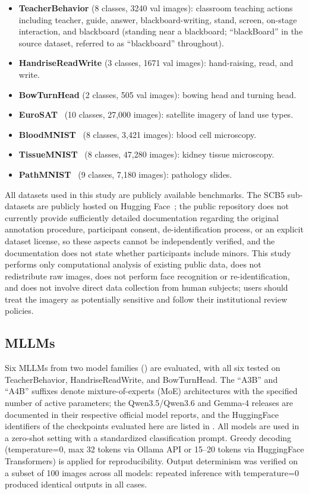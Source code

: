 \documentclass[11pt,a4paper]{article}
\begin{document}
\begin{itemize}
    \item \textbf{TeacherBehavior} (8 classes, 3240 val images): classroom teaching actions including teacher, guide, answer, blackboard-writing, stand, screen, on-stage interaction, and blackboard (standing near a blackboard; ``blackBoard'' in the source dataset, referred to as ``blackboard'' throughout).
    \item \textbf{HandriseReadWrite} (3 classes, 1671 val images): hand-raising, read, and write.
    \item \textbf{BowTurnHead} (2 classes, 505 val images): bowing head and turning head.
    \item \textbf{EuroSAT}~\cite{helber2019eurosat} (10 classes, 27{,}000 images): satellite imagery of land use types.
    \item \textbf{BloodMNIST}~\cite{yang2023medmnist} (8 classes, 3{,}421 images): blood cell microscopy.
    \item \textbf{TissueMNIST}~\cite{yang2023medmnist} (8 classes, 47{,}280 images): kidney tissue microscopy.
    \item \textbf{PathMNIST}~\cite{yang2023medmnist} (9 classes, 7{,}180 images): pathology slides.
\end{itemize}

All datasets used in this study are publicly available benchmarks. The SCB5 sub-datasets are publicly hosted on Hugging Face~\cite{scb_dataset}; the public repository does not currently provide sufficiently detailed documentation regarding the original annotation procedure, participant consent, de-identification process, or an explicit dataset license, so these aspects cannot be independently verified, and the documentation does not state whether participants include minors. This study performs only computational analysis of existing public data, does not redistribute raw images, does not perform face recognition or re-identification, and does not involve direct data collection from human subjects; users should treat the imagery as potentially sensitive and follow their institutional review policies.



\subsection{MLLMs}
\label{sec:mllms}

Six MLLMs from two model families () are evaluated, with all six tested on TeacherBehavior, HandriseReadWrite, and BowTurnHead. The ``A3B'' and ``A4B'' suffixes denote mixture-of-experts (MoE) architectures with the specified number of active parameters; the Qwen3.5/Qwen3.6 and Gemma-4 releases are documented in their respective official model reports, and the HuggingFace identifiers of the checkpoints evaluated here are listed in . All models are used in a zero-shot setting with a standardized classification prompt. Greedy decoding (temperature=0, max 32 tokens via Ollama API or 15--20 tokens via HuggingFace Transformers) is applied for reproducibility. Output determinism was verified on a subset of 100 images across all models: repeated inference with temperature=0 produced identical outputs in all cases.
\end{document}
